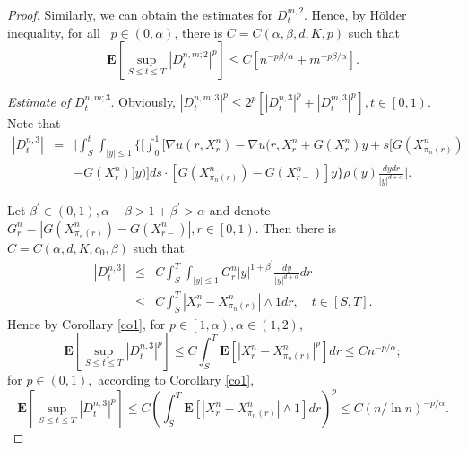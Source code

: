 \documentclass[11pt]{amsart}
\theoremstyle{plain}
\numberwithin{equation}{section}
\begin{document}
\begin{proof}
Similarly, we can obtain the estimates for $D_t^{m,2}$. Hence, by H\"{o}lder
inequality, for all ~$p\in (0,\alpha)$, there is $C=C\left( \alpha ,\beta
,d,K,p\right) $ such that 
\begin{equation*}
\mathbf{E}\left[ \sup_{S\leq t\leq T}\left\vert D_{t}^{n,m;2}\right\vert ^{p}\right] \leq C[n^{-p\beta /\alpha }+m^{-p\beta /\alpha }].
\end{equation*}

\emph{Estimate of }$D_{t}^{n,m;3}$. Obviously, $\left\vert
D_{t}^{n,m;3}\right\vert ^{p}\leq 2^{p}[\left\vert D_{t}^{n,3}\right\vert
^{p}+\left\vert D_{t}^{m,3}\right\vert ^{p}],t\in \left[ 0,1\right) $. Note
that 
\begin{eqnarray*}
\left\vert D_{t}^{n,3}\right\vert &=&\Big\vert\int_{S}^{t}\int_{\left\vert
y\right\vert \leq 1}\Big\{\lbrack \int_{0}^{1}[\nabla u\left(
r,X_{r}^{n}\right) -\nabla u\Big(r,X_{r}^{n}+G\left( X_{r}^{n}\right) y+s\Big\lbrack G\left( X_{\pi _{n}\left( r\right) }^{n}\right) \\
&&-G\left( X_{r}^{n}\right) \Big\rbrack y\Big)]ds\cdot \left[ G\left( X_{\pi
_{n}\left( r\right) }^{n}\right) -G\left( X_{r-}^{n}\right) \right] y\Big\}\rho \left( y\right) \frac{dydr}{\left\vert y\right\vert ^{d+\alpha }}\Big\vert.
\end{eqnarray*}

Let $\beta ^{\prime }\in \left( 0,1\right) ,\alpha +\beta >1+\beta ^{\prime
}>\alpha $ and denote $G_{r}^{n}=\left\vert G\left( X_{\pi _{n}\left(
r\right) }^{n}\right) -G\left( X_{r-}^{n}\right) \right\vert ,r\in \left[
0,1\right) $. Then there is $C=C\left( \alpha ,d,K,c_{0},\beta \right) $
such that\begin{eqnarray*}
\left\vert D_{t}^{n,3}\right\vert &\leq &C\int_{S}^{T}\int_{\left\vert
y\right\vert \leq 1}G_{r}^{n}\left\vert y\right\vert ^{1+\beta ^{\prime }}\frac{dy}{\left\vert y\right\vert ^{d+\alpha }}dr \\
&\leq &C\int_{S}^{T}\left\vert X_{r}^{n}-X_{\pi _{n}\left( r\right)
}^{n}\right\vert \wedge 1dr,\quad t\in \left[ S,T\right] .
\end{eqnarray*}Hence by Corollary \ref{co1}, for $p\in \left[ 1,\alpha \right) ,\alpha \in
\left( 1,2\right) $, 
\begin{equation*}
\mathbf{E}\left[ \sup_{S\leq t\leq T}\left\vert D_{t}^{n,3}\right\vert ^{p}\right] \leq C\int_{S}^{T}\mathbf{E}\left[ \left\vert X_{r}^{n}-X_{\pi
_{n}\left( r\right) }^{n}\right\vert ^{p}\right] dr\leq Cn^{-p/\alpha };
\end{equation*}for $p\in \left( 0,1\right) ,$ according to Corollary \ref{co1}, 
\begin{equation*}
\mathbf{E}\left[ \sup_{S\leq t\leq T}\left\vert D_{t}^{n,3}\right\vert ^{p}\right] \leq C\left( \int_{S}^{T}\mathbf{E}\left[ \left\vert
X_{r}^{n}-X_{\pi _{n}\left( r\right) }^{n}\right\vert \wedge 1\right]
dr\right) ^{p}\leq C\left( n/\ln n\right) ^{-p/\alpha }.
\end{equation*}


\end{proof}
\end{document}
